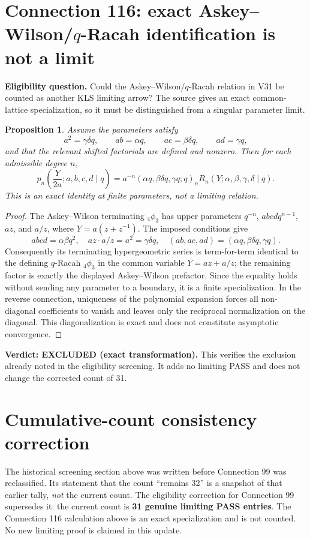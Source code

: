 \documentclass[11pt]{article}
\newtheorem{proposition}{Proposition}
\begin{document}
\section{Connection 116: exact Askey--Wilson/$q$-Racah identification is not a limit}
\noindent\textbf{Eligibility question.} Could the Askey--Wilson/$q$-Racah relation in V31 be counted as another KLS limiting arrow? The source gives an exact common-lattice specialization, so it must be distinguished from a singular parameter limit.
\begin{proposition}
Assume the parameters satisfy
\[
 a^2=\gamma\delta q,\qquad ab=\alpha q,\qquad
 ac=\beta\delta q,\qquad ad=\gamma q,
\]
and that the relevant shifted factorials are defined and nonzero. Then for each admissible degree $n$,
\[
 p_n\!\left(\frac{Y}{2a};a,b,c,d\mid q\right)
 =a^{-n}(\alpha q,\beta\delta q,\gamma q;q)_n
 R_n(Y;\alpha,\beta,\gamma,\delta\mid q).
\]
This is an exact identity at finite parameters, not a limiting relation.
\end{proposition}
\begin{proof}
The Askey--Wilson terminating ${}_4\phi_3$ has upper parameters
$q^{-n}$, $abcdq^{n-1}$, $az$, and $a/z$, where
$Y=a(z+z^{-1})$. The imposed conditions give
\[
 abcd=\alpha\beta q^2,\quad
 az\cdot a/z=a^2=\gamma\delta q,\quad
 (ab,ac,ad)=(\alpha q,\beta\delta q,\gamma q).
\]
Consequently its terminating hypergeometric series is term-for-term
identical to the defining $q$-Racah ${}_4\phi_3$ in the common variable
$Y=az+a/z$; the remaining factor is exactly the displayed
Askey--Wilson prefactor. Since the equality holds without sending any
parameter to a boundary, it is a finite specialization. In the reverse
connection, uniqueness of the polynomial expansion forces all
non-diagonal coefficients to vanish and leaves only the reciprocal
normalization on the diagonal. This diagonalization is exact and does
not constitute asymptotic convergence.
\end{proof}
\noindent\textbf{Verdict: EXCLUDED (exact transformation).} This verifies the exclusion already noted in the eligibility screening. It adds no limiting PASS and does not change the corrected count of 31.

\section{Cumulative-count consistency correction}
\noindent The historical screening section above was written before
Connection 99 was reclassified. Its statement that the count ``remains
32'' is a snapshot of that earlier tally, \emph{not} the current count.
The eligibility correction for Connection 99 supersedes it: the
current count is \textbf{31 genuine limiting PASS entries}. The
Connection 116 calculation above is an exact specialization and is
not counted. No new limiting proof is claimed in this update.
\end{document}
